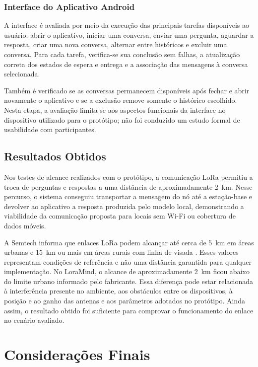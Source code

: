 \documentclass[12pt]{article}
\begin{document}
\subsubsection{Interface do Aplicativo Android}

A interface é avaliada por meio da execução das principais tarefas disponíveis ao usuário: abrir o aplicativo, iniciar uma conversa, enviar uma pergunta, aguardar a resposta, criar uma nova conversa, alternar entre históricos e excluir uma conversa. Para cada tarefa, verifica-se sua conclusão sem falhas, a atualização correta dos estados de espera e entrega e a associação das mensagens à conversa selecionada.

Também é verificado se as conversas permanecem disponíveis após fechar e abrir novamente o aplicativo e se a exclusão remove somente o histórico escolhido. Nesta etapa, a avaliação limita-se aos aspectos funcionais da interface no dispositivo utilizado para o protótipo; não foi conduzido um estudo formal de usabilidade com participantes.

\subsection{Resultados Obtidos}

Nos testes de alcance realizados com o protótipo, a comunicação LoRa permitiu a troca de perguntas e respostas a uma distância de aproximadamente 2~km. Nesse percurso, o sistema conseguiu transportar a mensagem do nó até a estação-base e devolver ao aplicativo a resposta produzida pelo modelo local, demonstrando a viabilidade da comunicação proposta para locais sem Wi-Fi ou cobertura de dados móveis.

A Semtech informa que enlaces LoRa podem alcançar até cerca de 5~km em áreas urbanas e 15~km ou mais em áreas rurais com linha de visada \cite{semtechrange2018}. Esses valores representam condições de referência e não uma distância garantida para qualquer implementação. No LoraMind, o alcance de aproximadamente 2~km ficou abaixo do limite urbano informado pelo fabricante. Essa diferença pode estar relacionada à interferência presente no ambiente, aos obstáculos entre os dispositivos, à posição e ao ganho das antenas e aos parâmetros adotados no protótipo. Ainda assim, o resultado obtido foi suficiente para comprovar o funcionamento do enlace no cenário avaliado.

\section{Considerações Finais}
\label{sec:consideracoes-finais}
\end{document}
